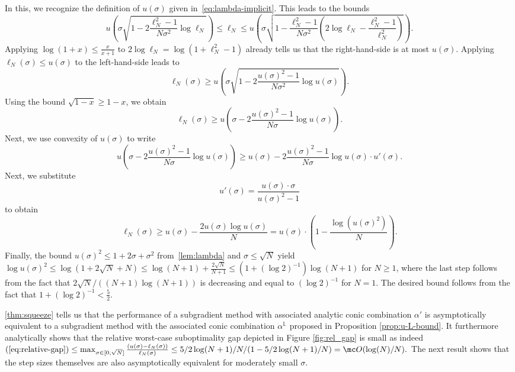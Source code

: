 \documentclass{article}
\begin{document}
\begin{appendixproof}
\[\]
In this, we recognize the definition of $u(\sigma)$ given in~\eqref{eq:lambda-implicit}.
    This leads to the bounds
    \begin{equation}\label{eq:l-bounds}
    u\left(\sigma\sqrt{1-2\frac{\ell_N^2-1}{N\sigma^2}\log\ell_N}\right)\le\ell_N\le u\left(\sigma\sqrt{1-\frac{\ell_N^2-1 }{N\sigma^2}\left(2\log\ell_N-\frac{\ell_N^2-1}{\ell_N^2}\right)}\right).
    \end{equation}
    Applying $\log(1+x)\le\frac{x}{x+1}$ to $2\log\ell_N=\log(1+\ell_N^2-1)$ already tells us that the right-hand-side is at most $u(\sigma)$.
    Applying $\ell_N(\sigma)\le u(\sigma)$ to the left-hand-side leads to
    \[
    \ell_N(\sigma)\ge u\left(\sigma\sqrt{1-2\frac{u(\sigma)^2-1}{N\sigma^2}\log u(\sigma)}\right).
    \]
    Using the bound $\sqrt{1-x}\ge1-x$, we obtain
    \[
    \ell_N(\sigma)\ge u\left(\sigma-2\frac{u(\sigma)^2-1}{N\sigma}\log u(\sigma)\right).
    \]
    Next, we use convexity of $u(\sigma)$ to write 
    \[
    u\left(\sigma-2\frac{u(\sigma)^2-1}{N\sigma}\log u(\sigma)\right)\ge u(\sigma)-2\frac{u(\sigma)^2-1}{N\sigma}\log u(\sigma)\cdot u'(\sigma).
    \]
    Next, we substitute
    \[
    u'(\sigma)=\frac{u(\sigma)\cdot\sigma}{u(\sigma)^2-1}
    \]
    to obtain
    \[
    \ell_N(\sigma)\ge u(\sigma)-\frac{2u(\sigma)\log u(\sigma)}{N}=u(\sigma)\cdot\left(1-\frac{\log( u(\sigma)^2)}{N}\right).
    \]
    Finally, the bound $u(\sigma)^2\le1+2\sigma +\sigma^2$ from~\cref{lem:lambda} and $\sigma\le\sqrt{N}$ yield $\log u(\sigma)^2\le \log(1+2\sqrt{N} +N)\le\log (N+1)+\frac{2\sqrt{N}}{N+1}\le (1+(\log2)^{-1})\log(N+1)$ for $N\ge1$, where the last step follows from the fact that $2\sqrt{N}/((N+1)\log(N+1))$ is decreasing and equal to $(\log2)^{-1}$ for $N=1$. The desired bound follows from the fact that $1+(\log2)^{-1}<\frac52$.
\end{appendixproof}


\cref{thm:squeeze} tells us that the performance of a subgradient method with associated analytic conic combination $\alpha'$ is asymptotically equivalent to a subgradient method with the associated conic combination $\alpha^{\mathbb L}$ proposed in Proposition \ref{prop:u-L-bound}.
It furthermore analytically shows that the relative worst-case suboptimality gap depicted in Figure \ref{fig:rel_gap} is small as indeed
\(
  (\ref{eq:relative-gap}) \leq \max_{\sigma \in [0, \sqrt{N}]} \tfrac{(u(\sigma)-\ell_N(\sigma))}{\ell_N(\sigma)}\leq 5/2\log(N+1)/N/(1-5/2\log(N+1)/N)=\mc O(\log(N)/N).
\)
The next result shows that the step sizes themselves are also asymptotically equivalent for moderately small $\sigma$.
\end{document}
